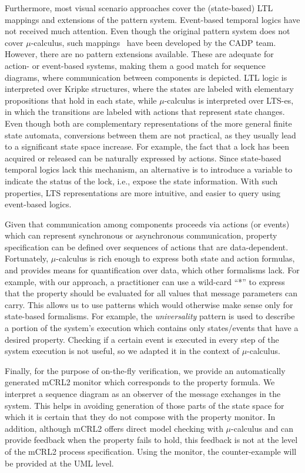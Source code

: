 \documentclass[letter]{llncs}
\begin{document}
Furthermore, most visual scenario approaches cover the (state-based) LTL mappings and extensions of the pattern system. 
Event-based temporal logics have not received much attention. Even though the original pattern 
system does not cover $\mu$-calculus, such mappings~\cite{RAFMC} have been developed by the CADP team.
However, there are no pattern extensions available. These are adequate for action- or event-based systems,
making them a good match for sequence diagrams, where communication between components is depicted.
LTL logic is interpreted over Kripke structures, where the states are labeled with elementary 
propositions that hold in each state, while $\mu$-calculus is interpreted over LTS-es, in which the transitions
are labeled with actions that represent state changes.
Even though both are complementary representations of the more general finite state automata, 
conversions between them are not practical, as they usually lead to a significant state space increase. 
For example, the fact that a lock has
been acquired or released can be naturally expressed by actions. Since state-based
temporal logics lack this mechanism, an alternative is to introduce a variable to indicate
the status of the lock, i.e., expose the state information. With such properties, LTS
representations are more intuitive, and easier to query using event-based logics.
\vspace{-1 pt}

Given that communication among components proceeds via actions (or events) which can
represent synchronous or asynchronous communication, property specification
can be defined over sequences of actions that are data-dependent.
Fortunately, $\mu$-calculus is rich enough to express both state and action formulas,
and provides means for quantification over data, which other formalisms lack. 
For example, with our approach, a practitioner can use 
a wild-card ``*'' to express that the property should be evaluated for all values
that message parameters can carry. This allows us to use patterns which would otherwise
make sense only for state-based formalisms. For example, the \emph{universality}
pattern is used to describe a portion of the system's execution which contains only states/events that have a desired property.
Checking if a certain event is executed in every step of the system execution is not useful,
so we adapted it in the context of $\mu$-calculus. 
\vspace{-1 pt}

Finally, for the purpose of on-the-fly verification, we provide an
automatically generated mCRL2 monitor which corresponds to the property formula.
We interpret a sequence diagram as an observer of
the message exchanges in the system. This helps in avoiding generation of those
parts of the state space for which it is certain that they do not compose with the
property monitor. In addition, although mCRL2 offers direct model checking
with $\mu$-calculus and can provide feedback when the property fails to hold, this
feedback is not at the level of the mCRL2 process specification.
Using the monitor, the counter-example will be provided at the UML level.
\end{document}
